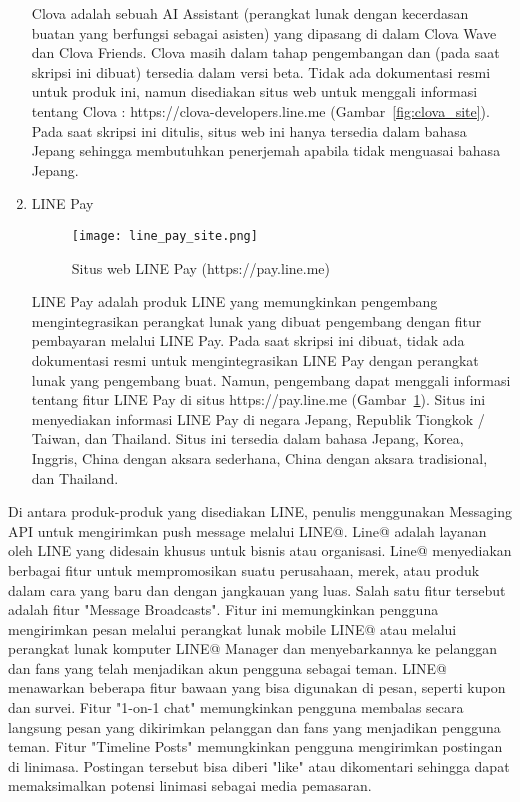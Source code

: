 \begin{enumerate}
Clova adalah sebuah AI Assistant (perangkat lunak dengan kecerdasan buatan yang berfungsi sebagai asisten) yang dipasang di dalam Clova Wave dan Clova Friends. Clova masih dalam tahap pengembangan dan (pada saat skripsi ini dibuat) tersedia dalam versi beta. Tidak ada dokumentasi resmi untuk produk ini, namun disediakan situs web untuk menggali informasi tentang Clova : https://clova-developers.line.me (Gambar~\ref{fig:clova_site}). Pada saat skripsi ini ditulis, situs web ini hanya tersedia dalam bahasa Jepang sehingga membutuhkan penerjemah apabila tidak menguasai bahasa Jepang.

\item LINE Pay
\begin{figure}[H]
	\centering  
	\texttt{[image: line\_pay\_site.png]}  
	\caption[Situs web LINE Pay]{Situs web LINE Pay (https://pay.line.me)} 
	\label{fig:line_pay_site} 
\end{figure}

LINE Pay adalah produk LINE yang memungkinkan pengembang mengintegrasikan perangkat lunak yang dibuat pengembang dengan fitur pembayaran melalui LINE Pay. Pada saat skripsi ini dibuat, tidak ada dokumentasi resmi untuk mengintegrasikan LINE Pay dengan perangkat lunak yang pengembang buat. Namun, pengembang dapat menggali informasi tentang fitur LINE Pay di situs https://pay.line.me (Gambar~\ref{fig:line_pay_site}). Situs ini menyediakan informasi LINE Pay di negara Jepang, Republik Tiongkok / Taiwan, dan Thailand. Situs ini tersedia dalam bahasa Jepang, Korea, Inggris, China dengan aksara sederhana, China dengan aksara tradisional, dan Thailand.

\end{enumerate}

Di antara produk-produk yang disediakan LINE, penulis menggunakan Messaging API untuk mengirimkan push message melalui LINE@. Line@ adalah layanan oleh LINE yang didesain khusus untuk bisnis atau organisasi. Line@ menyediakan berbagai fitur untuk mempromosikan suatu perusahaan, merek, atau produk dalam cara yang baru dan dengan jangkauan yang luas. Salah satu fitur tersebut adalah fitur "Message Broadcasts". Fitur ini memungkinkan pengguna mengirimkan pesan melalui perangkat lunak mobile LINE@ atau melalui perangkat lunak komputer LINE@ Manager dan menyebarkannya ke pelanggan dan fans yang telah menjadikan akun pengguna sebagai teman. LINE@ menawarkan beberapa fitur bawaan yang bisa digunakan di pesan, seperti kupon dan survei. Fitur "1-on-1 chat" memungkinkan pengguna membalas secara langsung pesan yang dikirimkan pelanggan dan fans yang menjadikan pengguna teman. Fitur "Timeline Posts" memungkinkan pengguna mengirimkan postingan di linimasa. Postingan tersebut bisa diberi "like" atau dikomentari sehingga dapat memaksimalkan potensi linimasi sebagai media pemasaran.

